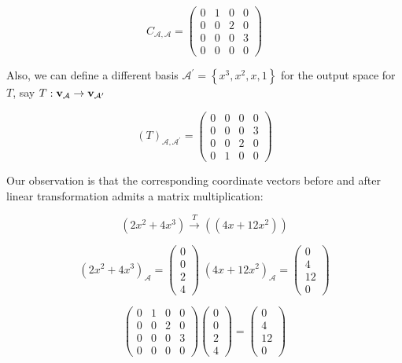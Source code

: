 \documentclass[11pt]{article}
\begin{document}
\[
{C}_{\mathcal{A},\mathcal{A}} = \left( \begin{array}{llll} 0 & 1 & 0 & 0 \\  0 & 0 & 2 & 0 \\  0 & 0 & 0 & 3 \\  0 & 0 & 0 & 0 \end{array}\right)
\]

Also, we can define a different basis \({\mathcal{A}}^{\prime } = \left\{  {{x}^{3},{x}^2,x,1}\right\}\) for the output space for \(T\), say \(T : {\bf v}_{\mathcal{A}} \rightarrow  {\bf v}_{{\mathcal{A}}^{\prime }}\)

\[
{\left( T\right) }_{\mathcal{A},{\mathcal{A}}^{\prime }} = \left( \begin{array}{llll} 0 & 0 & 0 & 0 \\  0 & 0 & 0 & 3 \\  0 & 0 & 2 & 0 \\  0 & 1 & 0 & 0 \end{array}\right)
\]

Our observation is that the corresponding coordinate vectors before and after linear transformation admits a matrix multiplication:

\[
\left( {2{x}^2 + 4{x}^{3}}\right) \overset{T}{ \rightarrow  }\left( \left( {{4x} + {12}{x}^2}\right) \right)
\]

\[
{\left( 2{x}^2 + 4{x}^{3}\right) }_{\mathcal{A}} = \left( \begin{array}{l} 0 \\  0 \\  2 \\  4 \end{array}\right) \;{\left( 4x + {12}{x}^2\right) }_{\mathcal{A}} = \left( \begin{array}{l} 0 \\  4 \\  {12} \\  0 \end{array}\right)
\]

\[
\left( \begin{array}{llll} 0 & 1 & 0 & 0 \\  0 & 0 & 2 & 0 \\  0 & 0 & 0 & 3 \\  0 & 0 & 0 & 0 \end{array}\right) \left( \begin{array}{l} 0 \\  0 \\  2 \\  4 \end{array}\right)  = \left( \begin{array}{l} 0 \\  4 \\  {12} \\  0 \end{array}\right)
\]
\end{document}
